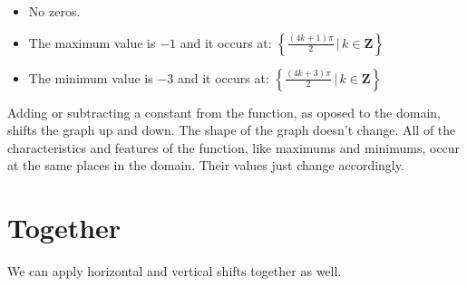 \documentclass{ximera}
\begin{document}
\begin{example}
\begin{image}
\end{image}



\begin{itemize}
\item No zeros.
\item The maximum value is $-1$ and it occurs at:  $\left\{     \frac{(4k+1)\pi}{2} \, | \, k \in \textbf{Z}     \right\}$
\item The minimum value is $-3$ and it occurs at:  $\left\{    \frac{(4k+3)\pi}{2} \, | \, k \in \textbf{Z}     \right\}$
\end{itemize}














\end{example}






Adding or subtracting a constant from the function, as oposed to the domain, shifts the graph up and down.  The shape of the graph doesn't change.  All of the characteristics and features of the function, like maximums and minimums, occur at the same places in the domain.  Their values just change accordingly.



























\section{Together}

We can apply horizontal and vertical shifts together as well.
\end{document}
